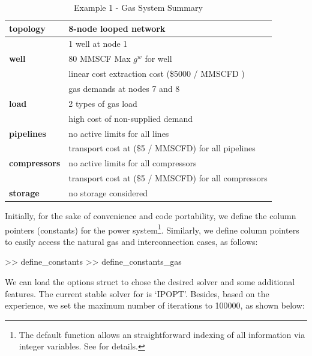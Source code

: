 \begin{table}[!ht]
\centering
\begin{threeparttable}
\caption{Example 1 - Gas System Summary}
\label{tab:ex1_gas}
\footnotesize
\begin{tabular}{ll}
\toprule
\bf{topology}	& 8-node looped network	 \\
\midrule
			& 1 well at node 1\\
\bf{well}		& 80 MMSCF Max $g^{w}$ for well\\
			& linear cost extraction cost (\$5000 / MMSCFD )\\
\midrule
			& gas demands at nodes 7 and 8\\
\bf{load}		& 2 types of gas load 	\\
			& high cost of non-supplied demand\\
\midrule
\bf{pipelines}	& no active limits for all lines	\\
			& transport cost at (\$5 / MMSCFD) for all pipelines \\
\midrule
\bf{compressors}	& no active limits for all compressors	\\
			& transport cost at (\$5 / MMSCFD) for all compressors \\
\midrule
\bf{storage}	& no storage considered	\\			
\bottomrule
\end{tabular}
\begin{tablenotes}
 \scriptsize
 \item [] {}
\end{tablenotes}
\end{threeparttable}
\end{table}

Initially, for the sake of convenience and code portability, we define the column pointers (constants) for the power system\footnote{The default \matpower{} function  allows an straightforward indexing of all information via integer variables. See \cite{matpower_manual} for details.}. Similarly, we define column pointers to easily access the natural gas and interconnection cases, as follows:

\begin{Code}
>> define_constants        %
>> define_constants_gas    %
\end{Code}

We can load the \matpower{} options struct to chose the desired solver and some additional features. The current stable solver for \mpng{}  is `IPOPT'. Besides, based on the experience, we set the maximum number of iterations to 100000, as shown below:


